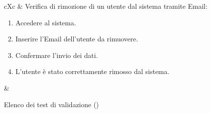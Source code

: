 \begin{table}[H]
\begin{VTtable}[1.7]{\textwidth}{cXc}
        \addtotv & Verifica di rimozione di un utente dal sistema tramite Email:
        \begin{enumerate}
            \item Accedere al sistema.
            \item Inserire l'Email dell'utente da rimuovere.
            \item Confermare l'invio dei dati.
            \item L'utente è stato correttamente rimosso dal sistema.
        \end{enumerate}
        & \TNI \\
        \bottomrule
	\end{VTtable}
	\caption{Elenco dei test di validazione (\thetableCounter)}
\end{table}

